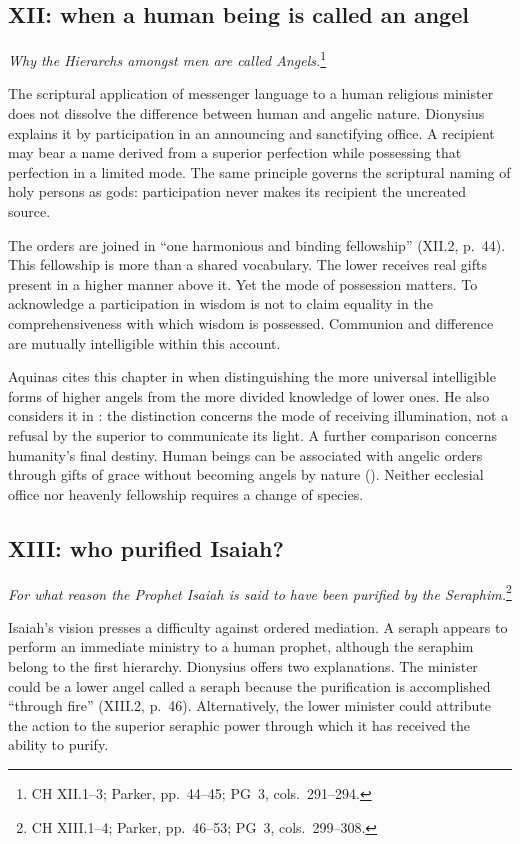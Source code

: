\subsection{XII: when a human being is called an angel}
\emph{Why the Hierarchs amongst men are called Angels.}\footnote{CH XII.1--3; Parker, pp.~44--45; PG~3, cols.~291--294.}

The scriptural application of messenger language to a human religious minister does not dissolve the difference between human and angelic nature. Dionysius explains it by participation in an announcing and sanctifying office. A recipient may bear a name derived from a superior perfection while possessing that perfection in a limited mode. The same principle governs the scriptural naming of holy persons as gods: participation never makes its recipient the uncreated source.

The orders are joined in ``one harmonious and binding fellowship'' (XII.2, p.~44). This fellowship is more than a shared vocabulary. The lower receives real gifts present in a higher manner above it. Yet the mode of possession matters. To acknowledge a participation in wisdom is not to claim equality in the comprehensiveness with which wisdom is possessed. Communion and difference are mutually intelligible within this account.

Aquinas cites this chapter in  when distinguishing the more universal intelligible forms of higher angels from the more divided knowledge of lower ones. He also considers it in : the distinction concerns the mode of receiving illumination, not a refusal by the superior to communicate its light. A further comparison concerns humanity's final destiny. Human beings can be associated with angelic orders through gifts of grace without becoming angels by nature (). Neither ecclesial office nor heavenly fellowship requires a change of species.

\subsection{XIII: who purified Isaiah?}
\emph{For what reason the Prophet Isaiah is said to have been purified by the Seraphim.}\footnote{CH XIII.1--4; Parker, pp.~46--53; PG~3, cols.~299--308.}

Isaiah's vision presses a difficulty against ordered mediation. A seraph appears to perform an immediate ministry to a human prophet, although the seraphim belong to the first hierarchy. Dionysius offers two explanations. The minister could be a lower angel called a seraph because the purification is accomplished ``through fire'' (XIII.2, p.~46). Alternatively, the lower minister could attribute the action to the superior seraphic power through which it has received the ability to purify.

